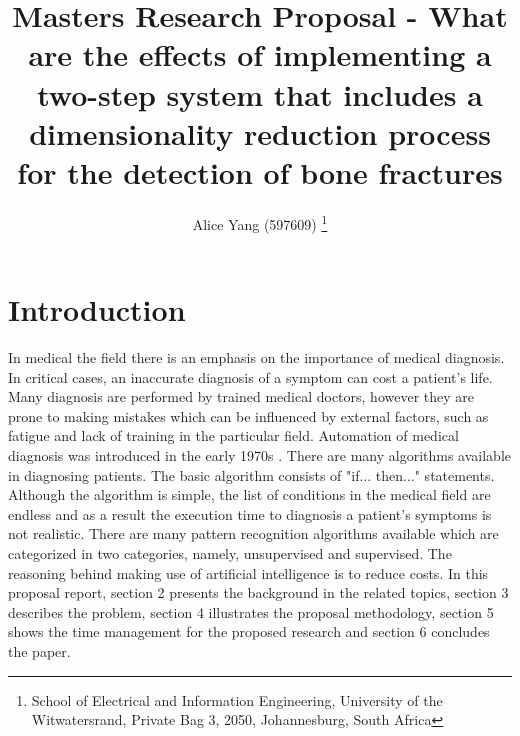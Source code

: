 \documentclass[11pt,twocolumn]{witseiepaper}
\begin{document}
	\title{Masters Research Proposal - What are the effects of implementing a two-step system that includes a dimensionality reduction process for the detection of bone fractures }
	
	\author{Alice Yang (597609) \thanks{School of Electrical and Information Engineering, University of the Witwatersrand, Private Bag 3, 2050, Johannesburg, South Africa} }
	
	
	\maketitle
	\thispagestyle{empty}\pagestyle{empty}
	
	\section{Introduction}
	In medical the field there is an emphasis on the importance of medical diagnosis. In critical cases, an inaccurate diagnosis of a symptom can cost a patient's life. Many diagnosis are performed by trained medical doctors, however they are prone to making mistakes which can be influenced by external factors, such as fatigue and lack of training in the particular field. Automation of medical diagnosis was introduced in the early 1970s \cite{Ramesh2004}. There are many algorithms available in diagnosing patients. The basic algorithm consists of "if... then..." statements. Although the algorithm is simple, the list of conditions in the medical field are endless and as a result the execution time to diagnosis a patient's symptoms is not realistic. There are many pattern recognition algorithms available which are categorized in two categories, namely, unsupervised and supervised. The reasoning behind making use of artificial intelligence is to reduce costs. In this proposal report, section 2 presents the background in the related topics, section 3 describes the problem, section 4 illustrates the proposal methodology, section 5 shows the time management for the proposed research and section 6 concludes the paper.
	
\end{document}
